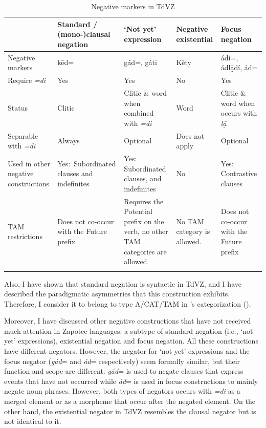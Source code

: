 \documentclass[output=paper,colorlinks=true, citecolor=brown]{langscibook}
\begin{document}
\begin{table}
\small
\begin{tabularx}{\textwidth}{Q>{\raggedright}p{3cm}>{\raggedright}p{3cm}@{~}>{\raggedright}p{1.8cm}@{~}Q@{}}
\lsptoprule
 & {Standard / \mbox{(mono-)clausal} negation} & {‘Not yet’\newline expression} & {Negative existential} & {Focus negation} \\
\midrule 
{Negative markers} & {kēd=}  & {gád=, gáti} & {Kěty} & {ádí=, ádlā̰dí, ád=} \\
\tablevspace
{Require \textit{=di}} & {Yes}  & {Yes} & {No} & {Yes} \\
\tablevspace
 {Status} & {Clitic} & {Clitic \& word when combined with \textit{=di}} &  {Word} &{Clitic \& word when occurs with \textit{lā̰}} \\
\tablevspace
{Separable with \textit{=di}} & {Always} & {Optional} & {Does not apply} & {Optional} \\
\tablevspace
{Used in other negative \mbox{constructions}} & \mbox{Yes:  Subordinated} clauses and indefinites & {Yes:  Subordinated clauses, and indefinites} & {No} & {Yes: Contrastive clauses} \\
\tablevspace
{TAM restrictions} & {Does not co-occur with the Future prefix} & {Requires the Potential prefix on the verb, no other TAM categories are allowed} & {No TAM category is allowed.} &  {Does not co-occur with the Future prefix}\\
\lspbottomrule
\end{tabularx}
\caption{Negative markers in TdVZ}
\label{tab:zap:2}
\end{table}

Also, I have shown that standard negation is syntactic \citep{Dahl1979} in TdVZ, and I have described the paradigmatic asymmetries that this construction exhibits. Therefore, I consider it to belong to type A/CAT/TAM in \citeauthor{Miestamo2005}’s categorization (\citeyear{Miestamo2005, Miestamo2007}).

Moreover, I have discussed other negative constructions that have not received much attention in Zapotec languages: a subtype of standard negation (i.e., ‘not yet’ expressions), existential negation and focus negation. All these constructions have different negators. However, the negator for ‘not yet’ expressions and the focus negator (\textit{gád}= and \textit{ád}= respectively) seem formally similar, but their function and scope are different: \textit{gád}= is used to negate clauses that express events that have not occurred while \textit{ád}= is used in focus constructions to mainly negate noun phrases. However, both types of negators occurs with \textit{=di} as a merged element or as a morpheme that occur after the negated element. On the other hand, the existential negator in TdVZ resembles the clausal negator but is not identical to it.
\end{document}
